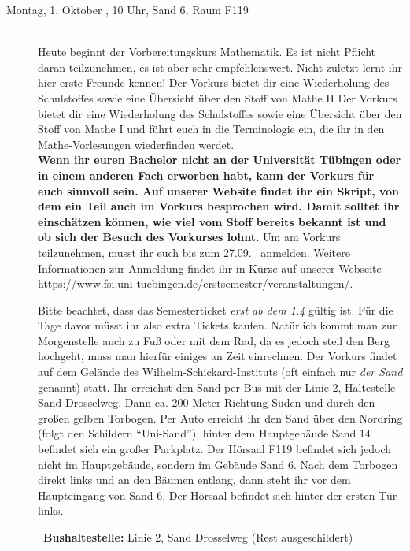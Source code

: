 \begin{description}
	

\item[Montag, 1. Oktober \Jahr, 10 Uhr, Sand 6, Raum F119]\ \\
Heute beginnt der Vorbereitungskurs Mathematik. Es ist nicht Pflicht daran teilzunehmen, 
es ist aber sehr empfehlenswert. Nicht zuletzt lernt ihr hier erste Freunde kennen!
\ifsommersemester
Der Vorkurs bietet dir eine Wiederholung des Schulstoffes sowie eine Übersicht über den Stoff von Mathe II 
\fi 
\ifwintersemester
Der Vorkurs bietet dir eine Wiederholung des Schulstoffes sowie eine Übersicht über den Stoff von Mathe I
\fi
und führt euch in die Terminologie ein, die ihr in den Mathe-Vorlesungen wiederfinden werdet.
\ifmaster
\\
\textbf{Wenn ihr euren Bachelor nicht an der Universität Tübingen oder in einem anderen Fach erworben habt, kann der Vorkurs für euch sinnvoll sein. Auf unserer Website findet ihr ein Skript, von dem ein Teil auch im Vorkurs besprochen wird. Damit solltet ihr einschätzen können, wie viel vom Stoff bereits bekannt ist und ob sich der Besuch des Vorkurses lohnt.}
\fi
Um am Vorkurs teilzunehmen, musst ihr euch bis zum 27.09. \Jahr~anmelden. Weitere Informationen zur Anmeldung findet ihr in Kürze auf unserer Webseite \url{https://www.fsi.uni-tuebingen.de/erstsemester/veranstaltungen/}.

\ifsommersemester
Bitte beachtet, dass das Semesterticket \emph{erst ab dem 1.4} gültig ist. Für die Tage davor müsst ihr also extra Tickets kaufen. Natürlich kommt man zur Morgenstelle auch zu Fuß oder mit dem Rad, da es jedoch steil den Berg hochgeht, muss man hierfür einiges an Zeit einrechnen.
\fi
Der Vorkurs findet auf dem Gelände des Wilhelm-Schickard-Instituts (oft einfach nur \emph{der Sand} genannt) statt. Ihr erreichst den Sand per Bus mit der Linie 2, Haltestelle Sand Drosselweg. Dann ca. 200 Meter Richtung Süden und durch den großen gelben Torbogen. Per Auto erreicht ihr den Sand über den Nordring (folgt den Schildern "`Uni-Sand"'), hinter dem Hauptgebäude Sand 14 befindet sich ein großer Parkplatz. Der Hörsaal F119 befindet sich jedoch nicht im Hauptgebäude, sondern im Gebäude Sand 6. Nach dem Torbogen direkt links und an den Bäumen entlang, dann steht ihr vor dem Haupteingang von Sand 6. Der Hörsaal befindet sich hinter der ersten Tür links. 
   
~\textbf{Bushaltestelle:} Linie 2, Sand Drosselweg (Rest ausgeschildert) 


\end{description}
